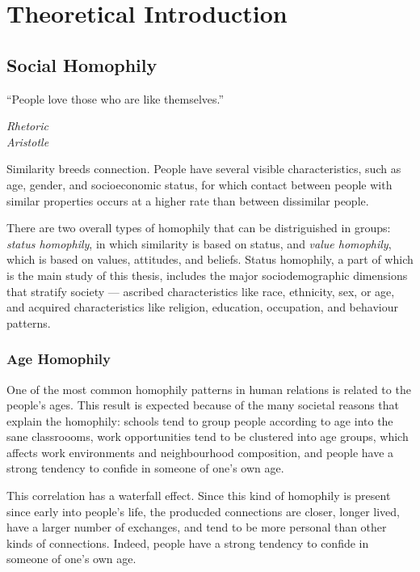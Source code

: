 \newcommand{\ypred}{y_{pred}}
\newcommand{\ytrue}{y_{true}}

\section{Theoretical Introduction}

\subsection{Social Homophily}

\epigraph{``People love those who are like themselves.''}{\textit{Rhetoric \\ Aristotle}}

Similarity breeds connection\cite{mcpherson2001birds}. People have several visible characteristics, such as age, gender, and socioeconomic status, for which contact between people with similar properties occurs at a higher rate than between dissimilar people.

There are two overall types of homophily that can be distriguished in groups\cite{lazarsfeld1954}: \textit{status homophily}, in which similarity is based on status, and \textit{value homophily}, which is based on values, attitudes, and beliefs. Status homophily, a part of which is the main study of this thesis, includes the major sociodemographic dimensions that stratify society --- ascribed characteristics like race, ethnicity, sex, or age, and acquired characteristics like religion, education, occupation, and behaviour patterns.

\subsubsection{Age Homophily}

One of the most common homophily patterns in human relations is related to the people's ages\cite{ugander2011}\cite{mcpherson2001birds}. This result is expected because of the many societal reasons that explain the homophily: schools tend to group people according to age into the sane classroooms, work opportunities tend to be clustered into age groups, which affects work environments and neighbourhood composition, and people have a strong tendency to confide in someone of one's own age.

This correlation has a waterfall effect. Since this kind of homophily is present since early into people's life, the producded connections are closer, longer lived, have a larger number of exchanges, and tend to be more personal than other kinds of connections. Indeed, people have a strong tendency to confide in someone of one's own age\cite{mcpherson2001birds}.

